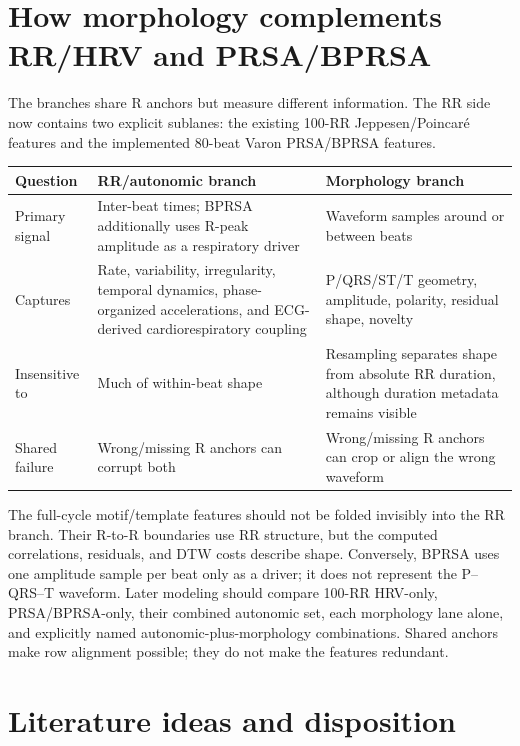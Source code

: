 \documentclass[11pt,a4paper]{article}
\begin{document}
\section{How morphology complements RR/HRV and PRSA/BPRSA}
\label{sec:rr}

The branches share R anchors but measure different information. The RR side
now contains two explicit sublanes: the existing 100-RR Jeppesen/Poincar\'e
features and the implemented 80-beat Varon PRSA/BPRSA features.

\begin{center}
\begin{tabularx}{\textwidth}{p{}X X}
\toprule
Question & RR/autonomic branch & Morphology branch \\
\midrule
Primary signal & Inter-beat times; BPRSA additionally uses R-peak amplitude as a respiratory driver & Waveform samples around or between beats \\
Captures & Rate, variability, irregularity, temporal dynamics, phase-organized accelerations, and ECG-derived cardiorespiratory coupling & P/QRS/ST/T geometry, amplitude, polarity, residual shape, novelty \\
Insensitive to & Much of within-beat shape & Resampling separates shape from absolute RR duration, although duration metadata remains visible \\
Shared failure & Wrong/missing R anchors can corrupt both & Wrong/missing R anchors can crop or align the wrong waveform \\
\bottomrule
\end{tabularx}
\end{center}

The full-cycle motif/template features should not be folded invisibly into the
RR branch. Their R-to-R boundaries use RR structure, but the computed
correlations, residuals, and DTW costs describe shape. Conversely, BPRSA uses
one amplitude sample per beat only as a driver; it does not represent the
P--QRS--T waveform. Later modeling should compare 100-RR HRV-only,
PRSA/BPRSA-only, their combined autonomic set, each morphology lane alone, and
explicitly named autonomic-plus-morphology combinations. Shared anchors make
row alignment possible; they do not make the features redundant.

\section{Literature ideas and disposition}
\label{sec:literature}
\end{document}
